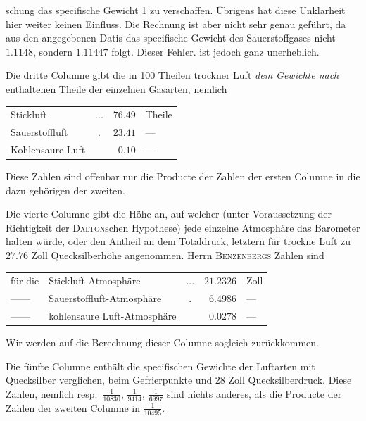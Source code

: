 \par\clearpage
{}\noindent schung das specifische Gewicht 1 zu verschaffen. Übrigens hat diese Unklarheit hier weiter keinen Einfluss. Die Rechnung ist aber nicht sehr genau geführt, da aus den angegebenen Datis das specifische Gewicht des Sauerstoffgases nicht $1.1148$, sondern $1.11447$ folgt. Dieser Fehler. ist jedoch ganz unerheblich.

Die dritte Columne gibt die in 100 Theilen trockner Luft \textit{dem Gewichte nach} enthaltenen Theile der einzelnen Gasarten, nemlich
\begin{center}\begin{tabular}{lcrl}
Stickluft & .\quad .\quad . & $76.49$ & Theile\\
Sauerstoffluft & . & $23.41$ & —\\
Kohlensaure Luft & & $0.10$ & —
\end{tabular}\end{center}
Diese Zahlen sind offenbar nur die Producte der Zahlen der ersten Columne in die dazu gehörigen der zweiten.

Die vierte Columne gibt die Höhe an, auf welcher (unter Voraussetzung der Richtigkeit der \textsc{Dalton}schen Hypothese) jede einzelne Atmosphäre das Barometer halten würde, oder den Antheil an dem Totaldruck, letztern für trockne Luft zu $27.76$ Zoll Quecksilberhöhe angenommen. Herrn \textsc{Benzenbergs} Zahlen sind
\begin{center}\begin{tabular}{llcrl}
für die & Stickluft-Atmosphäre & .\quad .\quad . & $21.2326$ & Zoll\\
—\quad — & Sauerstoffluft-Atmosphäre & . & $6.4986$ & —\\
—\quad — & kohlensaure Luft-Atmosphäre & & $0.0278$ & —
\end{tabular}\end{center}
Wir werden auf die Berechnung dieser Columne sogleich zurückkommen.

Die fünfte Columne enthält die specifischen Gewichte der Luftarten mit Quecksilber verglichen, beim Gefrierpunkte und 28 Zoll Quecksilberdruck. Diese Zahlen, nemlich resp.\ $\frac{1}{10830}$, $\frac{1}{9414}$, $\frac{1}{6997}$ sind nichts anderes, als die Producte der Zahlen der zweiten Columne in $\frac{1}{10495}$.


